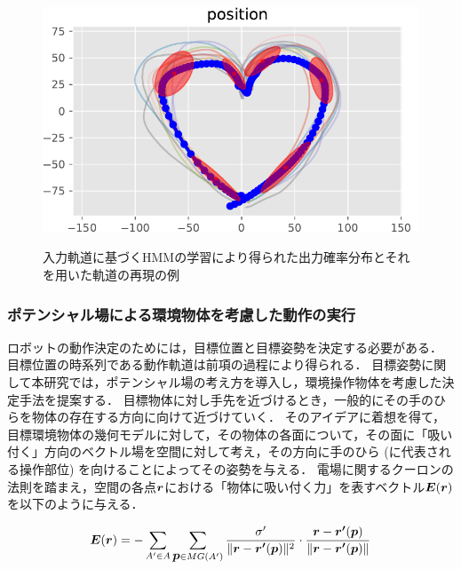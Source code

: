 \documentclass[twocolumn]{preport}
\def\vector#1{\mbox{\boldmath $#1$}}
\begin{document}
\begin{figure}[htbp]
\begin{center}
\begin{minipage}[t]{0.30\hsize}
\begin{center}
      \end{center}
    \end{minipage}
    \begin{minipage}[t]{0.37\hsize}
      \begin{center}
        \includegraphics[clip, width=1.0\columnwidth]{figs/heart_mpc_pos}
        \label{figure:MPC}
      \end{center}
    \end{minipage}
    \caption{入力軌道に基づくHMMの学習により得られた出力確率分布とそれを用いた軌道の再現の例}
    \label{figure:learning_reproduction}
  \end{center}
\end{figure}

\subsubsection{ポテンシャル場による環境物体を考慮した動作の実行}
ロボットの動作決定のためには，目標位置と目標姿勢を決定する必要がある．
目標位置の時系列である動作軌道は前項の過程により得られる．
目標姿勢に関して本研究では，ポテンシャル場の考え方を導入し，環境操作物体を考慮した決定手法を提案する．
目標物体に対し手先を近づけるとき，一般的にその手のひらを物体の存在する方向に向けて近づけていく．
そのアイデアに着想を得て，目標環境物体の幾何モデルに対して，その物体の各面について，その面に「吸い付く」方向のベクトル場を空間に対して考え，その方向に手のひら (に代表される操作部位) を向けることによってその姿勢を与える．
電場に関するクーロンの法則を踏まえ，空間の各点\(\vector{r}\)における「物体に吸い付く力」を表すベクトル\(\vector{E}(\vector{r})\)を以下のように与える．

\begin{equation}
  \label{equation:electronic_potential_simple}
  \vector{E}(\vector{r}) = - \sum_{A' \in A} {\sum_{\vector{p} \in MG(A')} { \frac {\sigma'} {\| \vector{r} - \vector{r'}(\vector{p}) \| ^ 2} \cdot \frac {\vector{r} - \vector{r'}(\vector{p})} {\| \vector{r} - \vector{r'}(\vector{p}) \|} } }
\end{equation}
\end{document}
